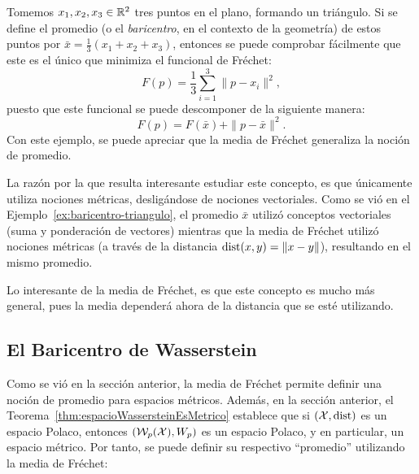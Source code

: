 \begin{example}\label{ex:baricentro-triangulo}
	Tomemos $x_1, x_2, x_3 \in \R^2$ tres puntos en el plano, formando un triángulo. Si se define el promedio (o el \textit{baricentro}, en el contexto de la geometría) de estos puntos por $\bar x = \frac{1}{3} (x_1 + x_2 + x_3)$, entonces se puede comprobar fácilmente que este es el único que minimiza el funcional de Fréchet:
	\begin{equation}
		F(p) = \frac{1}{3} \sum_{i=1}^{3} \|p - x_i\|^2,
	\end{equation}
	puesto que este funcional se puede descomponer de la siguiente manera:
	\begin{equation}
		F(p) = F(\bar x) + \|p-\bar x\|^2.
	\end{equation}
	Con este ejemplo, se puede apreciar que la media de Fréchet generaliza la noción de promedio.
\end{example}


\begin{remark}
	La razón por la que resulta interesante estudiar este concepto, es que únicamente utiliza nociones métricas, desligándose de nociones vectoriales. Como se vió en el Ejemplo~\ref{ex:baricentro-triangulo}, el promedio $\bar x$ utilizó conceptos vectoriales (suma y ponderación de vectores) mientras que la media de Fréchet utilizó nociones métricas (a través de la distancia $\dist(x, y) = \|x - y\|$), resultando en el mismo promedio.

	Lo interesante de la media de Fréchet, es que este concepto es mucho más general, pues la media dependerá ahora de la distancia que se esté utilizando.

\end{remark}


\subsection{El Baricentro de Wasserstein}\label{ssec:el-baricentro-de-Wasserstein}  %

Como se vió en la sección anterior, la media de Fréchet permite definir una noción de promedio para espacios métricos. Además, en la sección anterior, el Teorema~\ref{thm:espacioWassersteinEsMetrico} establece que si $(\cX, \dist)$ es un espacio Polaco, entonces $(\WassersteinSpace[p]{\cX}, W_p)$ es un espacio Polaco, y en particular, un espacio métrico. Por tanto, se puede definir su respectivo ``promedio'' utilizando la media de Fréchet:

